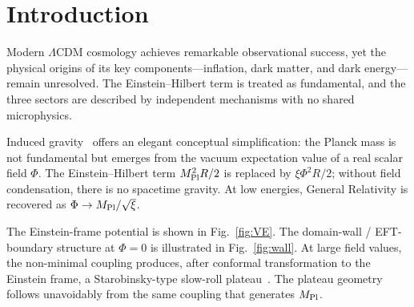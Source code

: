 \documentclass[pdflatex,sn-mathphys-num]{sn-jnl}
\newcommand{\MP}{M_{\rm Pl}}
\theoremstyle{thmstyleone}
\begin{document}
\maketitle



\section{Introduction}

Modern $\Lambda$CDM cosmology achieves remarkable observational success, yet the physical origins of its key components---inflation, dark matter, and dark energy---remain unresolved. The Einstein--Hilbert term is treated as fundamental, and the three sectors are described by independent mechanisms with no shared microphysics.

Induced gravity~\cite{Zee1979,Smolin1979} offers an elegant conceptual simplification: the Planck mass is not fundamental but emerges from the vacuum expectation value of a real scalar field $\Phi$. The Einstein--Hilbert term $M_{\rm Pl}^2R/2$ is replaced by $\xi\Phi^2R/2$; without field condensation, there is no spacetime gravity. At low energies, General Relativity is recovered as $\Phi\to\MP/\sqrt{\xi}$.

The Einstein-frame potential is shown in Fig.~\ref{fig:VE}. The domain-wall / EFT-boundary structure at $\Phi=0$ is illustrated in Fig.~\ref{fig:wall}. At large field values, the non-minimal coupling produces, after conformal transformation to the Einstein frame, a Starobinsky-type slow-roll plateau~\cite{Bezrukov2008,Starobinsky1980}. The plateau geometry follows unavoidably from the same coupling that generates $\MP$.
\end{document}
